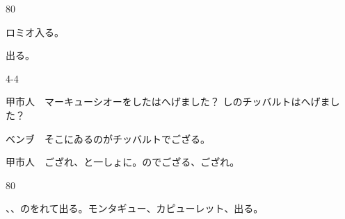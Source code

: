 \documentclass[tate,paper=b6j,jafontsize=9pt]{jlreq}
\begin{document}
\begin{azconvIndented}{8\zw}{0\zw}

ロミオ入る。

出る。

\end{azconvIndented}
\begin{azconvIndented}{4\zw}{-4\zw}

甲市人　マーキューシオーをしたはへげました？ しのチッバルトはへげました？

ベンヺ　そこにゐるのがチッバルトでござる。

甲市人　ござれ、と一しょに。のでござる、ござれ。

\end{azconvIndented}
\begin{azconvIndented}{8\zw}{0\zw}

、、のをれて出る。モンタギュー、カピューレット、出る。

\end{azconvIndented}
\end{document}
